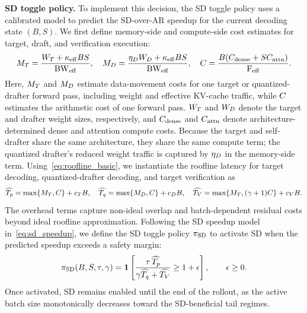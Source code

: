 \textbf{SD toggle policy.} 
To implement this decision, the SD toggle policy uses a calibrated model to predict the SD-over-AR speedup for the current decoding state $(B,S)$.
We first define memory-side and compute-side cost estimates for target, draft, and verification execution:
\begin{equation*}
M_T
=
\frac{W_T+\kappa_{\mathrm{eff}} BS}{\mathrm{BW}_{\mathrm{eff}}},
\quad
M_D
=
\frac{\eta_DW_D+\kappa_{\mathrm{eff}} BS}{\mathrm{BW}_{\mathrm{eff}}},
\quad
C
=
\frac{B(C_{\mathrm{dense}}+SC_{\mathrm{attn}})}{\mathrm{F}_{\mathrm{eff}}}.
\end{equation*}
Here, $M_T$ and $M_D$ estimate data-movement costs for one target or quantized-drafter forward pass, including weight and effective KV-cache traffic, while $C$ estimates the arithmetic cost of one forward pass.
$W_T$ and $W_D$ denote the target and drafter weight sizes, respectively, and $C_{\mathrm{dense}}$ and $C_{\mathrm{attn}}$ denote architecture-determined dense and attention compute costs.
Because the target and self-drafter share the same architecture, they share the same compute term; the quantized drafter's reduced weight traffic is captured by $\eta_D$ in the memory-side term.
Using~\cref{eq:roofline_basic}, we instantiate the roofline latency for target decoding, quantized-drafter decoding, and target verification as
\begin{equation*}
\widehat{T_p}
=
\max\{M_T,C\}
+
c_T B,
\quad
\widehat{T_q}
=
\max\{M_D,C\}
+
c_D B,
\quad
\widehat{T_V}
=
\max\{M_T,(\gamma+1)C\}
+
c_V B.
\label{eq:toggle_latencies}
\end{equation*}
The overhead terms capture non-ideal overlap and batch-dependent residual costs beyond ideal roofline approximation.
Following the SD speedup model in~\cref{eq:sd_speedup}, we define the SD toggle policy $\pi_{\mathrm{SD}}$ to activate SD when the predicted speedup exceeds a safety margin:
\begin{equation}
\pi_{\mathrm{SD}}(B,S,\tau,\gamma)
=
\mathbf{1}
\left[
\frac{
\tau\,\widehat{T_p}
}{
\gamma\widehat{T_q}
+
\widehat{T_V}
}
\geq
1+\epsilon
\right],
\qquad
\epsilon\geq0.
\label{eq:sd_speedup_toggle}
\end{equation}
Once activated, SD remains enabled until the end of the rollout, as the active batch size monotonically decreases toward the SD-beneficial tail regimes.

